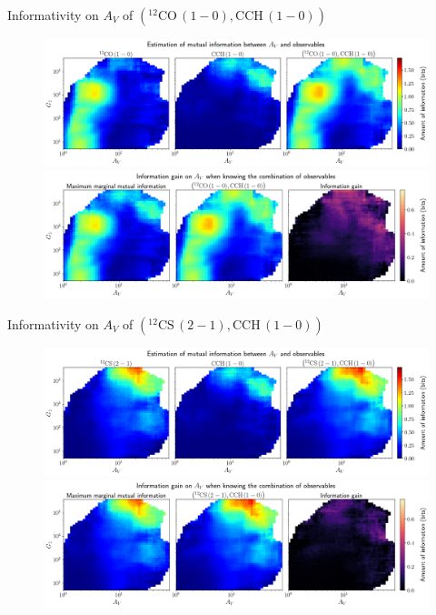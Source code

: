 \documentclass{beamer}
\begin{document}
\begin{frame}{Informativity on $A_V$ of $\left(\mathrm{^{12}CO\,(1-0)},\mathrm{CCH\,(1-0)}\right)$}
    \begin{figure}
        \centering
        \includegraphics[width=0.95\linewidth]{../mi/av__12co10_cch10_mi.png}
        \vfill
        \includegraphics[width=0.95\linewidth]{../mi/av__12co10_cch10_mi_gain.png}
    \end{figure}
\end{frame}

\begin{frame}{Informativity on $A_V$ of $\left(\mathrm{^{12}CS\,(2-1)},\mathrm{CCH\,(1-0)}\right)$}
    \begin{figure}
        \centering
        \includegraphics[width=0.95\linewidth]{../mi/av__12cs21_cch10_mi.png}
        \vfill
        \includegraphics[width=0.95\linewidth]{../mi/av__12cs21_cch10_mi_gain.png}
    \end{figure}
\end{frame}
\end{document}
